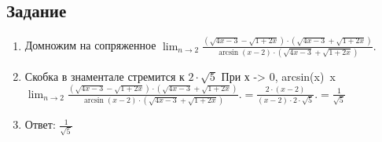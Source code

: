 \documentclass[a4paper,12pt]{article}
\begin{document}
        \subsection*{Задание}
            \begin{enumerate}
                \item Домножим на сопряженное
                 $\displaystyle \lim_{n\rightarrow 2} 
            \frac{
                   (\sqrt{4x - 3} -
                   \sqrt{1 + 2x}) 
                   \cdot
                   (\sqrt{4x - 3} +
                   \sqrt{1 + 2x})
                 }
                 {
                   \arcsin(x-2)
                   \cdot
                   (\sqrt{4x - 3} +
                   \sqrt{1 + 2x})
                 }.$
                \item Скобка в знаментале стремится к $2 \cdot \sqrt{5}$
                При х -> 0, arcsin(x)~x
                $\displaystyle \lim_{n\rightarrow 2} 
            \frac{
                   (\sqrt{4x - 3} -
                   \sqrt{1 + 2x}) 
                   \cdot
                   (\sqrt{4x - 3} +
                   \sqrt{1 + 2x})
                 }
                 {
                   \arcsin(x-2)
                   \cdot
                   (\sqrt{4x - 3} +
                   \sqrt{1 + 2x})
                 }. =
            \frac{
                   2 
                   \cdot
                   (x-2)
                 }
                 {
                   (x-2)
                   \cdot
                   2 \cdot \sqrt{5}
                 }. 
                 =
                \frac{1}{\sqrt{5}}
                 $
                \item Ответ: $\frac{1}{\sqrt{5}}$
            \end{enumerate}
\end{document}
